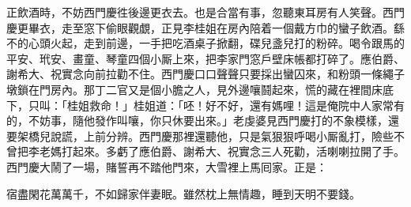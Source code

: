 正飲酒時，不妨西門慶徃後邊更衣去。也是合當有事，忽聽東耳房有人笑聲。西門慶更畢衣，走至窓下偷眼觀覷，正見李桂姐在房內陪着一個戴方巾的蠻子飲酒。{}繇不的心頭火起，走到前邊，一手把吃酒桌子掀翻，碟兒盞兒打的粉碎。喝令跟馬的平安、玳安、畫童、琴童四個小厮上來，把李家門窓戶壁床帳都打碎了。應伯爵、謝希大、祝實念向前拉勸不住。西門慶口口聲聲只要採出蠻囚來，和粉頭一條繩子墩鎖在門房內。那丁二官又是個小膽之人，見外邊嚷鬪起來，慌的藏在裡間床底下，只叫：「桂姐救命！」桂姐道：「呸！好不好，還有媽哩！這是俺院中人家常有的，不妨事，隨他發作叫嚷，你只休要出來。」老虔婆見西門慶打的不象模樣，還要架橋兒說謊，上前分辨。西門慶那裡還聽他，只是氣狠狠呼喝小厮亂打，險些不曾把李老媽打起來。多虧了應伯爵、謝希大、祝實念三人死勸，活喇喇拉開了手。西門慶大鬧了一場，賭誓再不踏他門來，大雪裡上馬囘家。正是：

宿盡閑花萬萬千，不如歸家伴妻眠。雖然枕上無情趣，睡到天明不要錢。


